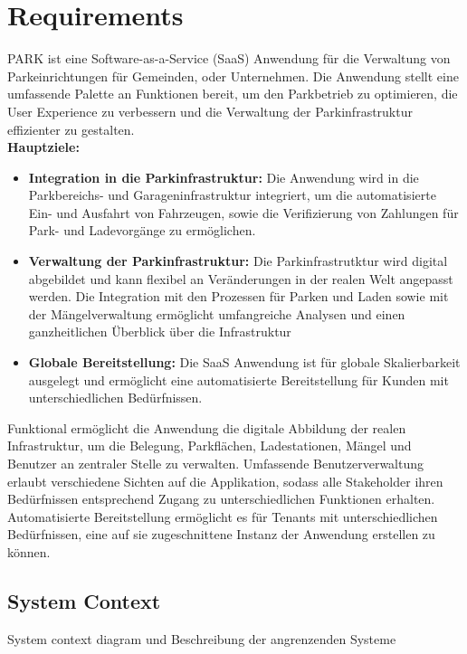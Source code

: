 \section{Requirements}

PARK ist eine Software-as-a-Service (SaaS) Anwendung für die Verwaltung von Parkeinrichtungen für Gemeinden, oder Unternehmen.
Die Anwendung stellt eine umfassende Palette an Funktionen bereit, um den Parkbetrieb zu optimieren, 
die User Experience zu verbessern und die Verwaltung der Parkinfrastruktur effizienter zu gestalten.  \\


\textbf{Hauptziele:}

\begin{itemize}
    \item \textbf{Integration in die Parkinfrastruktur:} Die Anwendung wird in die Parkbereichs- und Garageninfrastruktur integriert, um die automatisierte Ein- und Ausfahrt von Fahrzeugen, sowie die Verifizierung von Zahlungen für Park- und Ladevorgänge zu ermöglichen.
    \item \textbf{Verwaltung der Parkinfrastruktur:} Die Parkinfrastrutktur wird digital abgebildet und kann flexibel an Veränderungen in der realen Welt angepasst werden. Die Integration mit den Prozessen für Parken und Laden sowie mit der Mängelverwaltung ermöglicht umfangreiche Analysen und einen ganzheitlichen Überblick über die Infrastruktur
    \item \textbf{Globale Bereitstellung:} Die SaaS Anwendung ist für globale Skalierbarkeit ausgelegt und ermöglicht eine automatisierte Bereitstellung für Kunden mit unterschiedlichen Bedürfnissen.
\end{itemize}


Funktional ermöglicht die Anwendung die digitale Abbildung der realen Infrastruktur, um die Belegung, Parkflächen, Ladestationen, Mängel und Benutzer an zentraler Stelle zu verwalten. Umfassende Benutzerverwaltung erlaubt verschiedene Sichten auf die Applikation, sodass alle Stakeholder ihren Bedürfnissen entsprechend Zugang zu unterschiedlichen Funktionen erhalten. Automatisierte Bereitstellung ermöglicht es für Tenants mit unterschiedlichen Bedürfnissen, eine auf sie zugeschnittene Instanz der Anwendung erstellen zu können.


\subsection{System Context}
System context diagram und Beschreibung der angrenzenden Systeme

